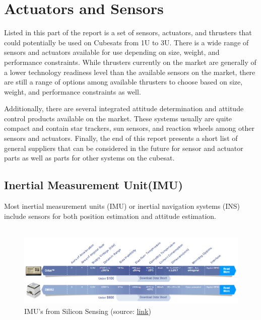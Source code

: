 \section{Actuators and Sensors}
Listed in this part of the report is a set of sensors, actuators, and thrusters that could potentially be used on Cubesats from 1U to 3U. There is a wide range of sensors and actuators available for use depending on size, weight, and performance constraints. While thrusters currently on the market are generally of a lower technology readiness level than the available sensors on the market, there are still a range of options among available thrusters to choose based on size, weight, and performance constraints as well. 

Additionally, there are several integrated attitude determination and attitude control products available on the market. These systems usually are quite compact and contain star trackers, sun sensors, and reaction wheels among other sensors and actuators. Finally, the end of this report presents a short list of general suppliers that can be considered in the future for sensor and actuator parts as well as parts for other systems on the cubesat. 

\subsection{Inertial Measurement Unit(IMU)}

Most inertial measurement units (IMU) or inertial navigation systems (INS) include sensors for both position estimation and attitude estimation. \\\\


\begin{figure}[!ht]
   \includegraphics[scale=0.6]{siliconSensing_IMU.PNG}
   \caption{IMU's from Silicon Sensing (source: \href{http://www.siliconsensing.com/products/inertial-modules-systems/}{link})}
\end{figure}



